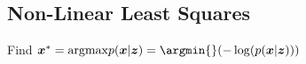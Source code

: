 \subsection{Non-Linear Least Squares}
Find $\vec{x}^* = \text{argmax} p(\vec{x} | \vec{z}) = \argmin{}(-\log(p(\vec{x}|\vec{z})))$


